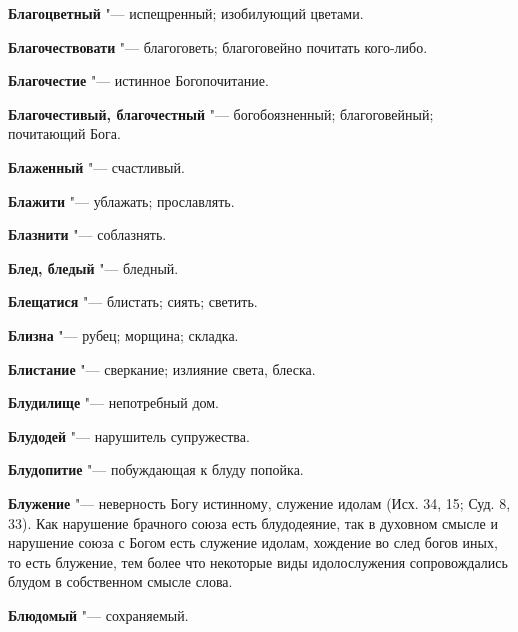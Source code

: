 \begin{mymulticols}{2}
\noindent\textbf{Благоцветный} "--- испещренный; изобилующий цветами. 




\noindent\textbf{Благочествовати} "--- благоговеть; благоговейно почитать кого-либо. 




\noindent\textbf{Благочестие} "--- истинное Богопочитание. 




\noindent\textbf{Благочестивый, благочестный} "--- богобоязненный; благоговейный; почитающий Бога. 




\noindent\textbf{Блаженный} "--- счастливый. 




\noindent\textbf{Блажити} "--- ублажать; прославлять. 




\noindent\textbf{Блазнити} "--- соблазнять. 




\noindent\textbf{Блед, бледый} "--- бледный. 




\noindent\textbf{Блещатися} "--- блистать; сиять; светить. 




\noindent\textbf{Близна} "--- рубец; морщина; складка. 




\noindent\textbf{Блистание} "--- сверкание; излияние света, блеска. 




\noindent\textbf{Блудилище} "--- непотребный дом. 




\noindent\textbf{Блудодей} "--- нарушитель супружества. 




\noindent\textbf{Блудопитие} "--- побуждающая к блуду попойка. 




\noindent\textbf{Блужение} "--- неверность Богу истинному, служение идолам (Исх. 34, 15; Суд. 8, 33). Как нарушение брачного союза есть блудодеяние, так в духовном смысле и нарушение союза с Богом есть служение идолам, хождение во след богов иных, то есть блужение, тем более что некоторые виды идолослужения сопровождались блудом в собственном смысле слова. 




\noindent\textbf{Блюдомый} "--- сохраняемый. 





\end{mymulticols}

